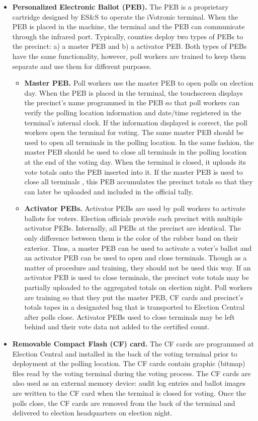 \begin{itemize}
\item \textbf{Personalized Electronic Ballot (PEB).} The PEB is a proprietary cartridge designed by ES\&S to operate the iVotronic terminal.  When the PEB is placed in the machine, the terminal and the PEB can communicate through the infrared port.  Typically, counties deploy two types of PEBs to the precinct: a) a master PEB and b) a activator PEB. Both types of PEBs have the same functionality, however, poll workers are trained to keep them separate and use them for different purposes.
    \begin{itemize}
    \item \textbf{Master PEB.}  Poll workers use the master PEB to open polls on election day. When the PEB is placed in the terminal, the touchscreen displays the precinct's name programmed in the PEB so that poll workers can verify the polling location information and date/time registered in the terminal's internal clock. If the information displayed is correct, the poll workers open the terminal for voting. The same master PEB should be used to open all terminals in the polling location. In the same fashion, the master PEB should be used to close all terminals in the polling location at the end of the voting day. When the terminal is closed, it uploads its vote totals onto the PEB inserted into it. If the master PEB is used to close all terminals , this PEB accumulates the precinct totals so that they can later be uploaded and included in the official tally.
    \item \textbf{Activator PEBs.}  Activator PEBs are used by  poll workers to activate ballots for voters. Election officials provide each precinct with multiple activator PEBs. Internally, all PEBs at the precinct are identical. The only difference between them is the color of the rubber band on their exterior. Thus, a master PEB can be used to activate a voter's ballot and an activator PEB can be used to open and close terminals. Though as a matter of procedure and training, they should not be used this way. If an activator PEB is used to close terminals, the precinct vote totals may be partially uploaded to the aggregated totals on election night. Poll workers are training so that they put the master PEB, CF cards and precinct's totals tapes in a designated bag that is transported to Election Central after polls close.  Activator PEBs used to close terminals may be left behind and their vote data not added to the certified count.
    \end{itemize}
\item \textbf{Removable Compact Flash (CF) card.} The CF cards are programmed at Election Central and installed in the back of the voting terminal prior to deployment at the polling location. The CF cards contain graphic (bitmap) files read by the voting terminal during the voting process. The CF cards are also used as an external memory device: audit log entries and ballot images are written to the CF card when the terminal is closed for voting. Once the polls close, the CF cards are removed from the back of the terminal and delivered to election headquarters on election night. 


\end{itemize}
